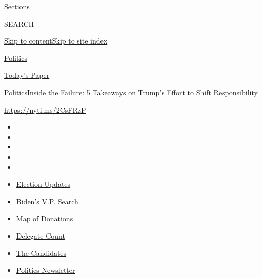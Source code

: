 Sections

SEARCH

\protect\hyperlink{site-content}{Skip to
content}\protect\hyperlink{site-index}{Skip to site index}

\href{https://www.nytimes.com/section/politics}{Politics}

\href{https://myaccount.nytimes.com/auth/login?response_type=cookie\&client_id=vi}{}

\href{https://www.nytimes.com/section/todayspaper}{Today's Paper}

\href{/section/politics}{Politics}\textbar{}Inside the Failure: 5
Takeaways on Trump's Effort to Shift Responsibility

\url{https://nyti.ms/2CsFRzP}

\begin{itemize}
\item
\item
\item
\item
\item
\end{itemize}

\begin{itemize}
\item
  \href{https://www.nytimes.com/2020/08/03/us/elections/biden-vs-trump.html?action=click\&pgtype=Article\&state=default\&region=TOP_BANNER\&context=storylines_menu}{Election
  Updates}
\item
  \href{https://www.nytimes.com/article/biden-vice-president-2020.html?action=click\&pgtype=Article\&state=default\&region=TOP_BANNER\&context=storylines_menu}{Biden's
  V.P. Search}
\item
  \href{https://www.nytimes.com/interactive/2020/07/24/us/politics/trump-biden-campaign-donors.html?action=click\&pgtype=Article\&state=default\&region=TOP_BANNER\&context=storylines_menu}{Map
  of Donations}
\item
  \href{https://www.nytimes.com/interactive/2020/us/elections/delegate-count-primary-results.html?action=click\&pgtype=Article\&state=default\&region=TOP_BANNER\&context=storylines_menu}{Delegate
  Count}
\item
  \href{https://www.nytimes.com/interactive/2019/us/politics/2020-presidential-candidates.html?action=click\&pgtype=Article\&state=default\&region=TOP_BANNER\&context=storylines_menu}{The
  Candidates}
\item
  \href{https://www.nytimes.com/newsletters/politics?action=click\&pgtype=Article\&state=default\&region=TOP_BANNER\&context=storylines_menu}{Politics
  Newsletter}
\end{itemize}

